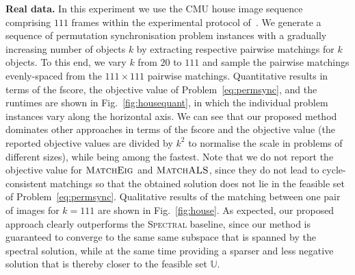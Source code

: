 \documentclass{article}
\begin{document}
\textbf{Real data.} In this experiment we use the CMU house image sequence~\cite{cmuHouse} comprising $111$ frames within the  
experimental protocol of~\cite{Pachauri:2013wx}.
We generate a sequence of permutation synchronisation problem instances with a gradually increasing number of objects $k$ by extracting respective pairwise matchings for $k$ objects. To this end, we vary $k$ from $20$ to $111$ and sample the pairwise matchings evenly-spaced from the $111 \times 111$ pairwise matchings.
%
Quantitative results in terms of the fscore, the objective value of Problem~\eqref{eq:permsync}, and the runtimes are shown in Fig.~\ref{fig:housequant}, in which the individual problem instances vary along the horizontal axis. We can see that our proposed method dominates other approaches in terms of the fscore and the objective value (the reported objective values are divided by $k^2$ to normalise the scale in problems of different sizes), while being among the fastest. Note that we do not report the objective value for $\textsc{MatchEig}$ and $\textsc{MatchALS}$, since they do not lead to cycle-consistent matchings so that the obtained solution does not lie in the feasible set  of Problem~\eqref{eq:permsync}.
Qualitative results of the matching between one pair of images for $k=111$ are shown in Fig.~\ref{fig:house}.  As expected, our proposed approach clearly outperforms the \textsc{Spectral} baseline, since our  method is guaranteed to  converge to the same same subspace that is spanned by the spectral solution, while at the same time providing a sparser and less negative solution that is thereby closer to the feasible set $\mathbb{U}$.
%
%
\end{document}
